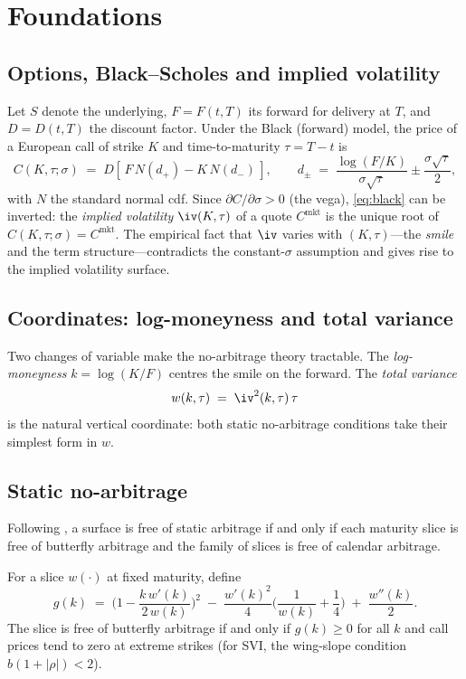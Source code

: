 \chapter{Foundations}\label{ch:foundations}

\section{Options, Black--Scholes and implied volatility}
Let $S$ denote the underlying, $F=F(t,T)$ its forward for delivery at $T$, and $D=D(t,T)$ the discount factor. Under the Black (forward) model, the price of a European call of strike $K$ and time-to-maturity $\tau=T-t$ is
\begin{equation}\label{eq:black}
  C(K,\tau;\sigma) \;=\; D\left[\,F\,N(d_+) - K\,N(d_-)\,\right],
  \qquad d_{\pm} \;=\; \frac{\log(F/K)}{\sigma\sqrt{\tau}} \pm \frac{\sigma\sqrt{\tau}}{2},
\end{equation}
with $N$ the standard normal cdf. Since $\partial C/\partial\sigma>0$ (the vega), \cref{eq:black} can be inverted: the \emph{implied volatility} $\iv(K,\tau)$ of a quote $C^{\mathrm{mkt}}$ is the unique root of $C(K,\tau;\sigma)=C^{\mathrm{mkt}}$. The empirical fact that $\iv$ varies with $(K,\tau)$---the \emph{smile} and the term structure---contradicts the constant-$\sigma$ assumption and gives rise to the implied volatility surface.

\section{Coordinates: log-moneyness and total variance}
Two changes of variable make the no-arbitrage theory tractable. The \emph{log-moneyness} $k=\log(K/F)$ centres the smile on the forward. The \emph{total variance}
\begin{equation}
  w(k,\tau) \;=\; \iv^2(k,\tau)\,\tau
\end{equation}
is the natural vertical coordinate: both static no-arbitrage conditions take their simplest form in $w$.

\section{Static no-arbitrage}\label{sec:noarb}
Following \cite{gatheral2014arbitrage, roper2010arbitrage}, a surface is free of static arbitrage if and only if each maturity slice is free of butterfly arbitrage and the family of slices is free of calendar arbitrage.

\begin{definition}
For a slice $w(\cdot)$ at fixed maturity, define
\begin{equation}\label{eq:durrleman}
  g(k) \;=\; \Big(1-\frac{k\,w'(k)}{2\,w(k)}\Big)^{2} \;-\; \frac{w'(k)^{2}}{4}\Big(\frac{1}{w(k)}+\frac14\Big) \;+\; \frac{w''(k)}{2}.
\end{equation}
The slice is free of butterfly arbitrage if and only if $g(k)\ge 0$ for all $k$ and call prices tend to zero at extreme strikes (for SVI, the wing-slope condition $b(1+|\rho|)<2$).
\end{definition}


